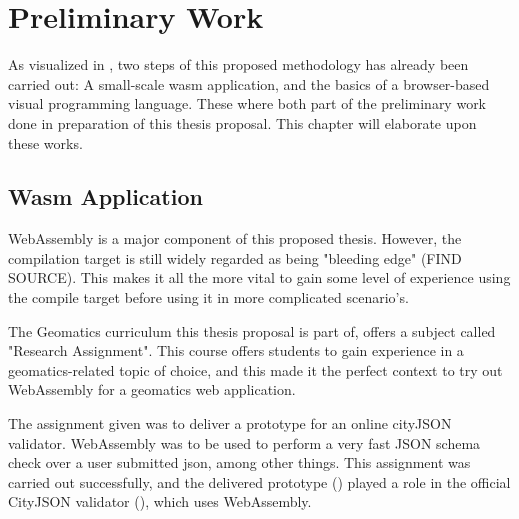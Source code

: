 

\section{Preliminary Work}

As visualized in , two steps of this proposed methodology has already been carried out: A small-scale wasm application, and the basics of a browser-based visual programming language. These where both part of the preliminary work done in preparation of this thesis proposal. This chapter will elaborate upon these works.


\subsection*{Wasm Application}

WebAssembly is a major component of this proposed thesis. However, the compilation target is still widely regarded as being "bleeding edge" (FIND SOURCE). This makes it all the more vital to gain some level of experience using the compile target before using it in more complicated scenario's. 

The Geomatics curriculum this thesis proposal is part of, offers a subject called "Research Assignment". This course offers students to gain experience in a geomatics-related topic of choice, and this made it the perfect context to try out WebAssembly for a geomatics web application.

The assignment given was to deliver a prototype for an online cityJSON validator. 
WebAssembly was to be used to perform a very fast JSON schema check over a user submitted json, among other things. 
This assignment was carried out successfully, and the delivered prototype () played a role in the official CityJSON validator (), which uses WebAssembly. 

